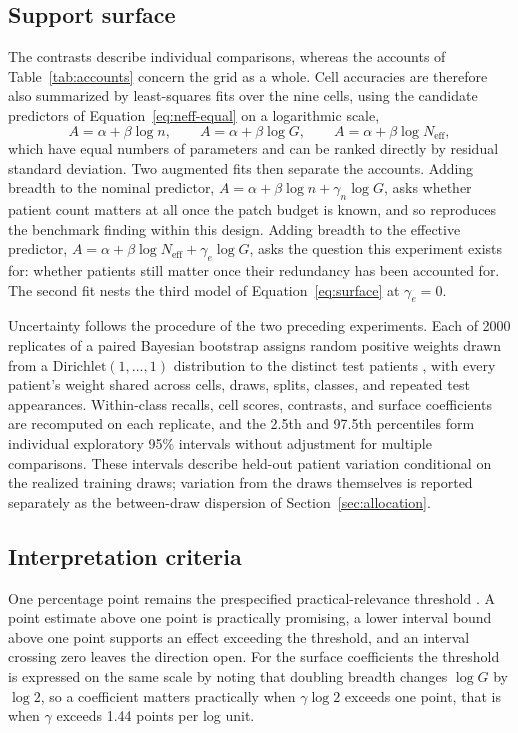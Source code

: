 \documentclass[11pt]{article}
\newcommand{\Neff}{N_{\mathrm{eff}}}
\begin{document}
\subsection{Support surface}
\label{sec:surface}
The contrasts describe individual comparisons, whereas the accounts of Table~\ref{tab:accounts} concern the grid as a whole. Cell accuracies are therefore also summarized by least-squares fits over the nine cells, using the candidate predictors of Equation~\eqref{eq:neff-equal} on a logarithmic scale,
\begin{equation}
  A=\alpha+\beta\log n,
  \qquad
  A=\alpha+\beta\log G,
  \qquad
  A=\alpha+\beta\log\Neff,
  \label{eq:surface}
\end{equation}
\noindent which have equal numbers of parameters and can be ranked directly by residual standard deviation. Two augmented fits then separate the accounts. Adding breadth to the nominal predictor, $A=\alpha+\beta\log n+\gamma_n\log G$, asks whether patient count matters at all once the patch budget is known, and so reproduces the benchmark finding within this design. Adding breadth to the effective predictor, $A=\alpha+\beta\log\Neff+\gamma_e\log G$, asks the question this experiment exists for: whether patients still matter once their redundancy has been accounted for. The second fit nests the third model of Equation~\eqref{eq:surface} at $\gamma_e=0$.

Uncertainty follows the procedure of the two preceding experiments. Each of \num{2000} replicates of a paired Bayesian bootstrap assigns random positive weights drawn from a $\mathrm{Dirichlet}(1,\ldots,1)$ distribution to the distinct test patients \citep{rubin1981bayesian}, with every patient's weight shared across cells, draws, splits, classes, and repeated test appearances. Within-class recalls, cell scores, contrasts, and surface coefficients are recomputed on each replicate, and the 2.5th and 97.5th percentiles form individual exploratory 95\% intervals without adjustment for multiple comparisons. These intervals describe held-out patient variation conditional on the realized training draws; variation from the draws themselves is reported separately as the between-draw dispersion of Section~\ref{sec:allocation}.

\subsection{Interpretation criteria}
\label{sec:interpretation}
One percentage point remains the prespecified practical-relevance threshold \citep{queisler2026patientShortage}. A point estimate above one point is practically promising, a lower interval bound above one point supports an effect exceeding the threshold, and an interval crossing zero leaves the direction open. For the surface coefficients the threshold is expressed on the same scale by noting that doubling breadth changes $\log G$ by $\log 2$, so a coefficient matters practically when $\gamma\log 2$ exceeds one point, that is when $\gamma$ exceeds 1.44 points per log unit.
\end{document}
